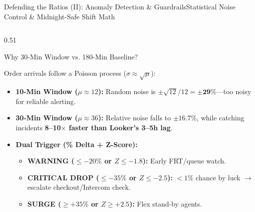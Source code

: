\documentclass[aspectratio=169,8pt]{beamer}
\begin{document}
\begin{frame}[t]{Defending the Ratios (II): Anomaly Detection \& Guardrails}{Statistical Noise Control \& Midnight-Safe Shift Math}
\vspace{2pt}
\begin{columns}[T,onlytextwidth]
  \begin{column}{0.51\textwidth}
    \begin{hfcard}{Why 30-Min Window vs. 180-Min Baseline?}
      {\fontsize{6.7}{8.5}\selectfont Order arrivals follow a Poisson process ($\sigma \approx \sqrt{\mu}$):
      \begin{itemize}\setlength\itemsep{2.5pt}
        \item \textbf{10-Min Window ($\mu \approx 12$):} Random noise is $\pm\sqrt{12}/12 = \mathbf{\pm 29\%}$---too noisy for reliable alerting.
        \item \textbf{30-Min Window ($\mu \approx 36$):} Relative noise falls to $\mathbf{\pm 16.7\%}$, while catching incidents \textbf{8--10$\times$ faster than Looker's 3--5h lag}.
        \item \textbf{Dual Trigger (\% Delta + Z-Score):}
          \begin{itemize}\setlength\itemsep{1.5pt}
            \item \textbf{\color{amberwarn}WARNING ($\leq -20\%$ or $Z \leq -1.8$):} Early FRT/queue watch.
            \item \textbf{\color{holaflyred}CRITICAL DROP ($\leq -35\%$ or $Z \leq -2.5$):} $<1\%$ chance by luck $\rightarrow$ escalate checkout/Intercom check.
            \item \textbf{\color{forestok}SURGE ($\geq +35\%$ or $Z \geq +2.5$):} Flex stand-by agents.
          \end{itemize}
      \end{itemize}
      }
    \end{hfcard}
  \end{column}


\end{columns}
\end{frame}
\end{document}
